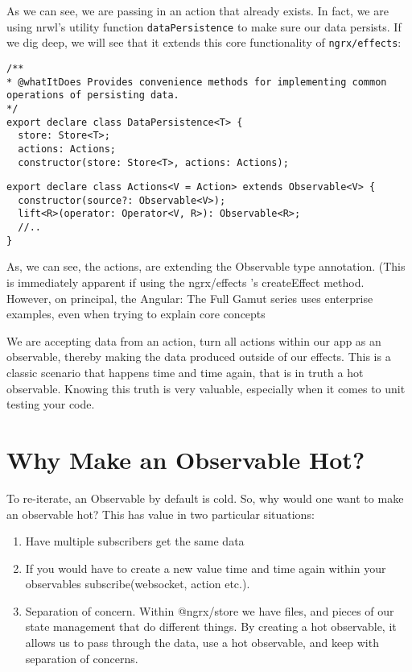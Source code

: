 As we can see, we are passing in an action that already exists. In fact, we are using nrwl's utility function \lstinline{dataPersistence} to make sure our data persists. If we dig deep, we will see that it extends this core functionality of \lstinline{ngrx/effects}: 
\begin{lstlisting}[caption=data-persistence.d.ts file from nrwl library]
/**
* @whatItDoes Provides convenience methods for implementing common operations of persisting data.
*/
export declare class DataPersistence<T> {
  store: Store<T>;
  actions: Actions;
  constructor(store: Store<T>, actions: Actions);  
\end{lstlisting}

\begin{lstlisting}[caption=actions.d.ts file from ngrx/effects library]
export declare class Actions<V = Action> extends Observable<V> {
  constructor(source?: Observable<V>);
  lift<R>(operator: Operator<V, R>): Observable<R>;
  //..
}  
\end{lstlisting}

As, we can see, the actions, are extending the Observable type annotation. (This is immediately apparent if using the ngrx/effects 's createEffect method. However, on principal, the Angular: The Full Gamut series uses enterprise examples, even when trying to explain core concepts

We are accepting data from an action, turn all actions within our app as an observable, thereby making the data produced outside of our effects. This is a classic scenario that happens time and time again, that is in truth a hot observable. Knowing this truth is very valuable, especially when it comes to unit testing your code.

\section{Why Make an Observable Hot?}
To re-iterate, an Observable by default is cold. So, why would one want to make an observable hot? This has value in two particular situations: 
\begin{enumerate}
  \item Have multiple subscribers get the same data
  \item If you would have to create a new value time and time again within your observables subscribe(websocket, action etc.).
  \item Separation of concern. Within @ngrx/store we have files, and pieces of our state management that do different things. By creating a hot observable, it allows us to pass through the data, use a hot observable, and keep with separation of concerns.
\end{enumerate}
